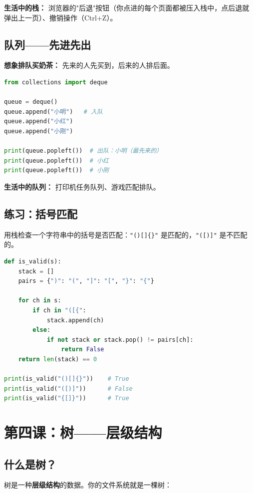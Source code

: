 \documentclass[a4paper,12pt]{ctexart}
\begin{document}
\textbf{生活中的栈：} 浏览器的"后退"按钮（你点进的每个页面都被压入栈中，点后退就弹出上一页）、撤销操作（Ctrl+Z）。

\subsection*{队列——先进先出}

\textbf{想象排队买奶茶：} 先来的人先买到，后来的人排后面。

\begin{lstlisting}[language=Python]
from collections import deque

queue = deque()
queue.append("小明")   # 入队
queue.append("小红")
queue.append("小刚")

print(queue.popleft())  # 出队：小明（最先来的）
print(queue.popleft())  # 小红
print(queue.popleft())  # 小刚
\end{lstlisting}

\textbf{生活中的队列：} 打印机任务队列、游戏匹配排队。

\subsection*{练习：括号匹配}

用栈检查一个字符串中的括号是否匹配：\texttt{"()[]\{\}"} 是匹配的，\texttt{"([)]"} 是不匹配的。

\begin{lstlisting}[language=Python]
def is_valid(s):
    stack = []
    pairs = {")": "(", "]": "[", "}": "{"}
    
    for ch in s:
        if ch in "([{":
            stack.append(ch)
        else:
            if not stack or stack.pop() != pairs[ch]:
                return False
    return len(stack) == 0

print(is_valid("()[]{}"))    # True
print(is_valid("([)]"))      # False
print(is_valid("{[]}"))      # True
\end{lstlisting}

\section*{第四课：树——层级结构}

\subsection*{什么是树？}

树是一种\textbf{层级结构}的数据。你的文件系统就是一棵树：
\end{document}
